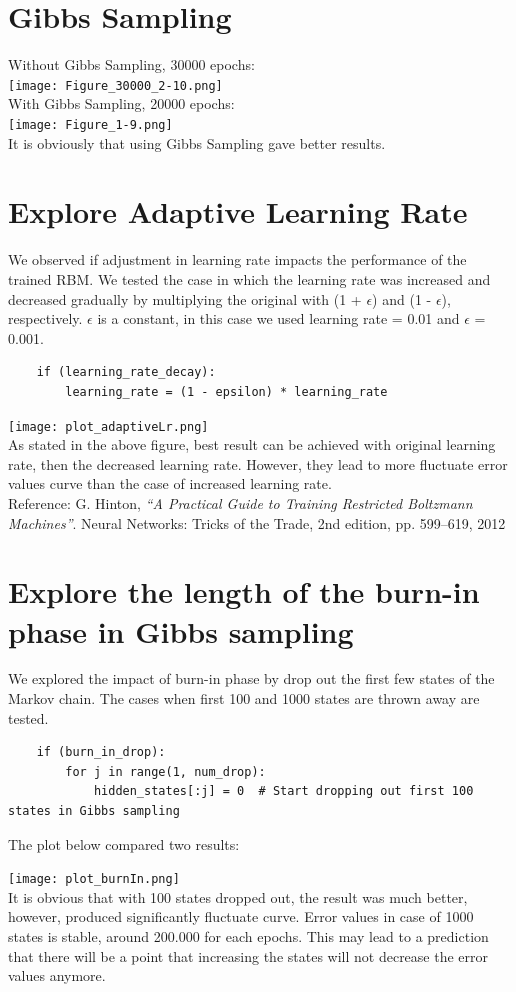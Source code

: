 \documentclass[a4paper]{article}
\begin{document}
\section{Gibbs Sampling}
Without Gibbs Sampling, 30000 epochs:\\
\texttt{[image: Figure\_30000\_2-10.png]}\\
With Gibbs Sampling, 20000 epochs:\\
\texttt{[image: Figure\_1-9.png]}\\
It is obviously that using Gibbs Sampling gave better results.
\section{Explore Adaptive Learning Rate}
We observed if adjustment in learning rate impacts the performance of the trained RBM. We tested the case in which the learning rate was increased and decreased gradually by multiplying the original with (1 + $\epsilon$) and (1 - $\epsilon$), respectively. $\epsilon$ is a constant, in this case we used learning rate = 0.01 and $\epsilon$ = 0.001. 
\begin{verbatim}
    if (learning_rate_decay):
        learning_rate = (1 - epsilon) * learning_rate
\end{verbatim}
\texttt{[image: plot\_adaptiveLr.png]}\\
As stated in the above figure, best result can be achieved with original learning rate, then the decreased learning rate. However, they lead to more fluctuate error values curve than the case of increased learning rate.\\
Reference: G. Hinton, \textit{“A Practical Guide to Training Restricted Boltzmann Machines”}. Neural Networks: Tricks of the Trade, 2nd edition, pp. 599–619, 2012
\section{Explore the length of the burn-in phase in Gibbs sampling}
We explored the impact of burn-in phase by drop out the first few states of the Markov chain. The cases when first 100 and 1000 states are thrown away are tested. 
\begin{verbatim}
    if (burn_in_drop):
        for j in range(1, num_drop):
            hidden_states[:j] = 0  # Start dropping out first 100 states in Gibbs sampling
\end{verbatim}
The plot below compared two results:

\texttt{[image: plot\_burnIn.png]}\\
It is obvious that with 100 states dropped out, the result was much better, however, produced significantly fluctuate curve. Error values in case of 1000 states is stable, around 200.000 for each epochs. This may lead to a prediction that there will be a point that increasing the states will not decrease the error values anymore.
\end{document}
